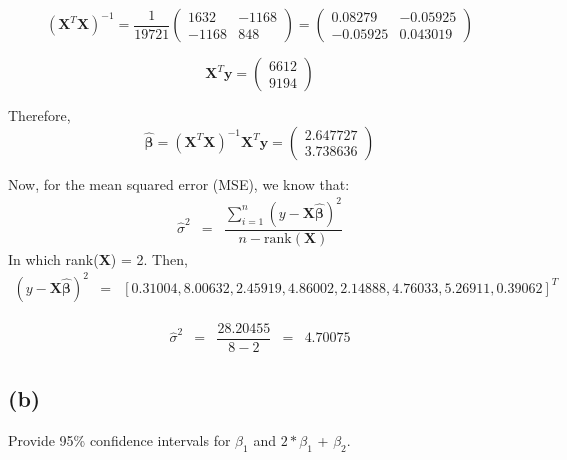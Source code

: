 \documentclass[a4paper, 11pt]{article}
\begin{document}
\begin{equation*}
(\textbf{X}^T \textbf{X})^{-1} = \dfrac{1}{19721}
\begin{pmatrix} 1632 & -1168 \\ -1168 & 848 \end{pmatrix} =
\begin{pmatrix} 0.08279 & -0.05925 \\ -0.05925 & 0.043019 \end{pmatrix} 
\end{equation*}

\begin{equation*}
\textbf{X}^T \textbf{y} = 
\begin{pmatrix} 6612 \\ 9194 \end{pmatrix} 
\end{equation*}

Therefore,
\begin{equation*}
\hat{\boldsymbol{\beta}} = (\textbf{X}^T\textbf{X})^{-1}\textbf{X}^T\textbf{y} = 
\begin{pmatrix} 2.647727 \\ 3.738636 \end{pmatrix} 
\end{equation*}

Now, for the mean squared error (MSE), we know that:
\begin{equation*}
\begin{array}{lclllll}
\hat{\sigma}^2 & = & \dfrac{\sum_{i=1}^{n}(y - \textbf{X}\hat{\boldsymbol{\beta}})^2}{n-\mbox{rank}(\textbf{X})}
\end{array}
\end{equation*}
\noindent
In which rank(\textbf{X}) = 2. Then,
\begin{equation*}
\begin{array}{lclllll}
(y - \textbf{X}\hat{\boldsymbol{\beta}})^2 & = & [0.31004, 8.00632, 2.45919, 4.86002, 2.14888, 4.76033, 5.26911, 0.39062]^T
\end{array}
\end{equation*}

\begin{equation*}
\begin{array}{lclllll}
\hat{\sigma}^2 & = & \dfrac{28.20455}{8-2} & = & 4.70075
\end{array}
\end{equation*}

\subsection*{(b)} Provide 95\% confidence intervals for $\beta_1$ and $2*\beta_1$ + $\beta_2$.
\end{document}
